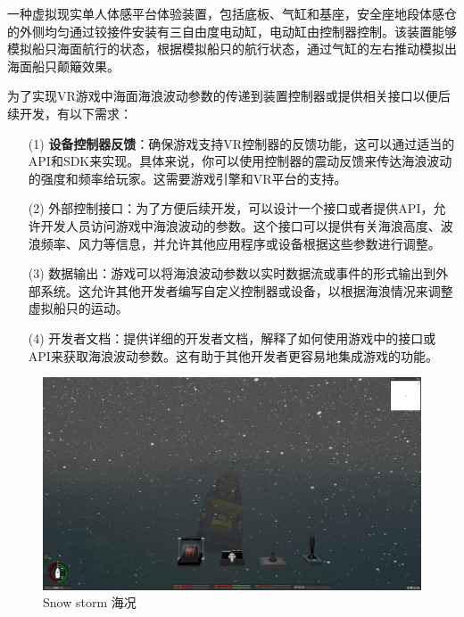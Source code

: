 \documentclass[a4paper,10pt]{article}
\begin{document}
		一种虚拟现实单人体感平台体验装置，包括底板、气缸和基座，安全座地段体感仓的外侧均匀通过铰接件安装有三自由度电动缸，电动缸由控制器控制。该装置能够模拟船只海面航行的状态，根据模拟船只的航行状态，通过气缸的左右推动模拟出海面船只颠簸效果。
		
		为了实现VR游戏中海面海浪波动参数的传递到装置控制器或提供相关接口以便后续开发，有以下需求：
		
		
		\begin{itemize}
			\item[(1)] 
			\textbf{设备控制器反馈}：确保游戏支持VR控制器的反馈功能，这可以通过适当的API和SDK来实现。具体来说，你可以使用控制器的震动反馈来传达海浪波动的强度和频率给玩家。这需要游戏引擎和VR平台的支持。
			
			\item[(2)]
			外部控制接口：为了方便后续开发，可以设计一个接口或者提供API，允许开发人员访问游戏中海浪波动的参数。这个接口可以提供有关海浪高度、波浪频率、风力等信息，并允许其他应用程序或设备根据这些参数进行调整。
			
			\item[(3)]
			数据输出：游戏可以将海浪波动参数以实时数据流或事件的形式输出到外部系统。这允许其他开发者编写自定义控制器或设备，以根据海浪情况来调整虚拟船只的运动。
			
			\item[(4)]
			开发者文档：提供详细的开发者文档，解释了如何使用游戏中的接口或API来获取海浪波动参数。这有助于其他开发者更容易地集成游戏的功能。
			
		\end{itemize}	
		
		\begin{figure}[htbp]
			\centering				
			\includegraphics[width=\columnwidth]{picture/Snow storm}
			\caption{
				\label{fig: Snow storm1} 
				Snow storm 海况
			}	
		\end{figure}
		
\end{document}
